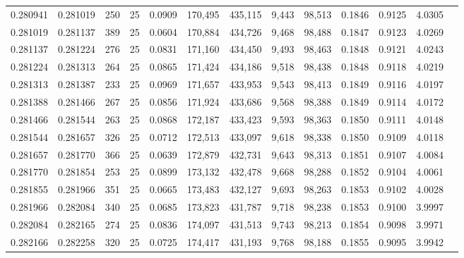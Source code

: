 \begin{tabular}{rrrrrrrrrrrrr}
0.280941 & 0.281019 &   250 &  25 &                                     0.0909 & 170,495 & 435,115 &   9,443 &  98,513 & 0.1846 & 0.9125 & 4.0305 \\
0.281019 & 0.281137 &   389 &  25 &                                     0.0604 & 170,884 & 434,726 &   9,468 &  98,488 & 0.1847 & 0.9123 & 4.0269 \\
0.281137 & 0.281224 &   276 &  25 &                                     0.0831 & 171,160 & 434,450 &   9,493 &  98,463 & 0.1848 & 0.9121 & 4.0243 \\
0.281224 & 0.281313 &   264 &  25 &                                     0.0865 & 171,424 & 434,186 &   9,518 &  98,438 & 0.1848 & 0.9118 & 4.0219 \\
0.281313 & 0.281387 &   233 &  25 &                                     0.0969 & 171,657 & 433,953 &   9,543 &  98,413 & 0.1849 & 0.9116 & 4.0197 \\
0.281388 & 0.281466 &   267 &  25 &                                     0.0856 & 171,924 & 433,686 &   9,568 &  98,388 & 0.1849 & 0.9114 & 4.0172 \\
0.281466 & 0.281544 &   263 &  25 &                                     0.0868 & 172,187 & 433,423 &   9,593 &  98,363 & 0.1850 & 0.9111 & 4.0148 \\
0.281544 & 0.281657 &   326 &  25 &                                     0.0712 & 172,513 & 433,097 &   9,618 &  98,338 & 0.1850 & 0.9109 & 4.0118 \\
0.281657 & 0.281770 &   366 &  25 &                                     0.0639 & 172,879 & 432,731 &   9,643 &  98,313 & 0.1851 & 0.9107 & 4.0084 \\
0.281770 & 0.281854 &   253 &  25 &                                     0.0899 & 173,132 & 432,478 &   9,668 &  98,288 & 0.1852 & 0.9104 & 4.0061 \\
0.281855 & 0.281966 &   351 &  25 &                                     0.0665 & 173,483 & 432,127 &   9,693 &  98,263 & 0.1853 & 0.9102 & 4.0028 \\
0.281966 & 0.282084 &   340 &  25 &                                     0.0685 & 173,823 & 431,787 &   9,718 &  98,238 & 0.1853 & 0.9100 & 3.9997 \\
0.282084 & 0.282165 &   274 &  25 &                                     0.0836 & 174,097 & 431,513 &   9,743 &  98,213 & 0.1854 & 0.9098 & 3.9971 \\
0.282166 & 0.282258 &   320 &  25 &                                     0.0725 & 174,417 & 431,193 &   9,768 &  98,188 & 0.1855 & 0.9095 & 3.9942 \\

\end{tabular}
